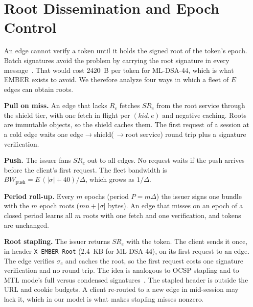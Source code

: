 \section{Root Dissemination and Epoch Control}
\label{sec:dissem}

An edge cannot verify a token until it holds the signed root of the token's epoch. Batch signatures avoid the problem by carrying the root signature in every message~\cite{batchsig2024}. That would cost \num{2420}~B per token for ML-DSA-44, which is what EMBER exists to avoid. We therefore analyze four ways in which a fleet of $E$ edges can obtain roots.

\textbf{Pull on miss.} An edge that lacks $R_e$ fetches $SR_e$ from the root service through the shield tier, with one fetch in flight per $(\mathit{kid},e)$ and negative caching. Roots are immutable objects, so the shield caches them. The first request of a session at a cold edge waits one edge$\to$shield(\,$\to$root service) round trip plus a signature verification.

\textbf{Push.} The issuer fans $SR_e$ out to all edges. No request waits if the push arrives before the client's first request. The fleet bandwidth is $BW_{\text{push}}=E\,(|\sigma|+40)/\Delta$, which grows as $1/\Delta$.

\textbf{Period roll-up.} Every $m$ epochs (period $P=m\Delta$) the issuer signs one bundle with the $m$ epoch roots ($mn+|\sigma|$ bytes). An edge that misses on an epoch of a closed period learns all $m$ roots with one fetch and one verification, and tokens are unchanged.

\textbf{Root stapling.} The issuer returns $SR_e$ with the token. The client sends it once, in header \texttt{X-EMBER-Root} (2.4~KB for ML-DSA-44), on its first request to an edge. The edge verifies $\sigma_e$ and caches the root, so the first request costs one signature verification and no round trip. The idea is analogous to OCSP stapling and to MTL mode's full versus condensed signatures~\cite{draft-mtl-mode}. The stapled header is outside the URL and cookie budgets. A client re-routed to a new edge in mid-session may lack it, which in our model is what makes stapling misses nonzero.

